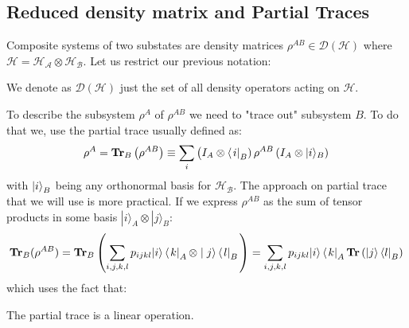 \subsection{Reduced density matrix and Partial Traces}
Composite systems of two substates are density matrices $\rho^{AB} \in \mathcal{D}(\mathcal{H})$ where $\mathcal{H}=\mathcal{H_A} \otimes\mathcal{H_B}$.
Let us restrict our previous notation:
\begin{note}
We denote as $\mathcal{D}(\mathcal{H})$ just the set of all density operators acting on $\mathcal{H}$.
\end{note}
To describe the subsystem $\rho^A$ 
of $\rho^{AB}$ we need to "trace out" subsystem $B$. To do that we, use the partial trace usually defined as:
$$
\rho^A=\operatorname{\textup{\textbf{Tr}}}_{B}\left( \rho^{AB} \right) \equiv \sum_{i}\left(I_{A} \otimes\left\langle\left. i\right|_{B}\right) \rho^{AB}\left(I_{A} \otimes|i\rangle_{B}\right)\right.
$$
with $\ket{i}_B$ being any orthonormal basis for $\mathcal{H_B}$. The approach on partial trace that we will use is more practical. If we express $\rho^{AB}$ as the sum of tensor products in some basis $|i\rangle_{A} \otimes|j\rangle_{B}$:
$$
\operatorname{\textup{\textbf{Tr}}}_B(\rho^{AB})=\operatorname{\textup{\textbf{Tr}}}_B \left( \sum_{i, j, k, l} p_{ijkl}|i\rangle\left\langle\left. k\right|_{A} \otimes \mid j\right\rangle\left\langle\left. l\right|_{B}\right. \right)= \sum_{i, j, k, l} p_{ijkl} |i\rangle\left\langle\left. k\right|_{A}  \operatorname{\textup{\textbf{Tr}}} \left(  |j\right\rangle\left\langle l\right|_{B} \right) 
$$
which uses the fact that:
\begin{note}
The partial trace is a linear operation.
\end{note}
